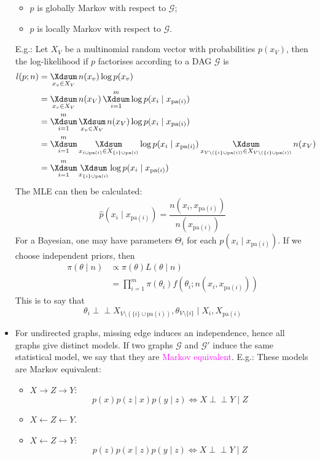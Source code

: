 \documentclass[UTF8]{book}
\DeclareMathOperator*{\Xsum}{\mathchoice{\Xdsum}{\Xtsum}{\Xtsum}{\Xtsum}}
\newcommand{\perpp}{\ensuremath{\perp\!\!\!\!\!\perp}}
\newcommand{\et}{&}
\newcommand{\concept}[1]{\textcolor{magenta}{#1}}
\begin{document}
\begin{itemize}
\begin{itemize}
	\item $p$ is globally Markov with respect to $\mathcal{G}$;
	\item $p$ is locally Markov with respect to $\mathcal{G}$.
\end{itemize}
E.g.: Let $X_V$ be a multinomial random vector with probabilities $p(x_V)$, then the log-likelihood if $p$ factorises according to a DAG $\mathcal{G}$ is 
\begin{align*}
	l(p; n) \et = \Xsum_{x_v\in X_V} n(x_v)\log p(x_v)\\
	\et = \Xsum_{x_v\in X_V}n(x_V)\Xsum_{i=1}^m \log p(x_i\mid x_{\mathrm{pa}(i)})\\
	\et = \Xsum_{i=1}^m\Xsum_{x_v\in X_V} n(x_V)\log p(x_i\mid x_{\mathrm{pa}(i)})\\
	\et = \Xsum_{i=1}^m\Xsum_{x_{i\cup \mathrm{pa}(i)}\in X_{\{i\}\cup\mathrm{pa}(i)}}\log p(x_i\mid x_{\mathrm{pa}(i)})\Xsum_{x_{V\setminus(\{i\}\cup\mathrm{pa}(i))} \in X_{V\setminus(\{i\}\cup\mathrm{pa}(i))}} n(x_V)\\
	\et = \Xsum_{i=1}^m\Xsum_{x_{\{i\}\cup\mathrm{pa}(i)}}\log p(x_i\mid x_{\mathrm{pa}(i)})
\end{align*}
The MLE can then be calculated:
$$
\hat{p}(x_i\mid x_{\mathrm{pa}(i)}) = \dfrac{n(x_i, x_{\mathrm{pa}(i)})}{n(x_{\mathrm{pa}(i)})}
$$
For a Bayesian, one may have parameters $\Theta_i$ for each $p(x_i\mid x_{\mathrm{pa}(i)})$. If we choose independent priors, then
\begin{align*}
	\pi(\theta\mid n) \et \propto \pi(\theta)L(\theta\mid n)\\
	\et = \prod_{i=1}^m \pi(\theta_i)f(\theta_i; n(x_i,x_{\mathrm{pa}(i)}))
\end{align*}
This is to say that
$$
\theta_i\perpp X_{V\setminus (\{i\}\cup\mathrm{pa}(i))},\theta_{V\setminus\{i\}}\mid X_i, X_{\mathrm{pa}(i)}
$$
\item For undirected graphs, missing edge induces an independence, hence all graphs give distinct models. If two graphs $\mathcal{G}$ and $\mathcal{G}'$ induce the same statistical model, we say that they are \concept{Markov equivalent}.
E.g.: These models are Markov equivalent:
\begin{itemize}
	\item $X\rightarrow Z\rightarrow Y$:
	$$
		p(x)p(z\mid x)p(y\mid z) \Leftrightarrow X\perpp Y\mid Z	
	$$
	\item $X\leftarrow Z\leftarrow Y$.
	\item $X\leftarrow Z\rightarrow Y$:
	$$
	    p(z)p(x\mid z)p(y\mid z) \Leftrightarrow X\perpp Y\mid Z
$$
\end{itemize}
\end{itemize}
\end{document}
